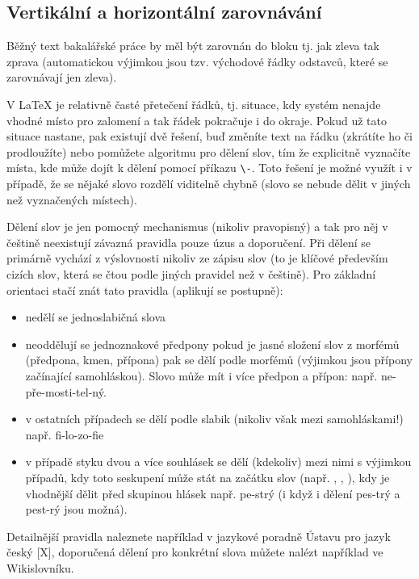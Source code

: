 \subsection{Vertikální a horizontální zarovnávání}

Běžný text bakalářské práce by měl být zarovnán do bloku tj. jak zleva tak zprava (automatickou výjimkou jsou tzv. východové řádky odstavců, které se zarovnávají jen zleva).

V \LaTeX{} je relativně časté přetečení řádků, tj. situace, kdy systém nenajde vhodné místo pro zalomení a tak řádek pokračuje i do okraje. Pokud už tato situace nastane, pak existují dvě řešení, buď změníte text na řádku (zkrátíte ho či prodloužíte) nebo pomůžete algoritmu pro dělení slov, tím že explicitně vyznačíte místa, kde může dojít k dělení pomocí příkazu \verb!\-!. Toto řešení je možné využít i v případě, že se nějaké slovo rozdělí viditelně chybně (slovo se nebude dělit v jiných než vyznačených místech).

Dělení slov je jen pomocný mechanismus (nikoliv pravopisný) a tak pro něj v češtině neexistují závazná pravidla pouze úzus a doporučení. Při dělení se primárně vychází z výslovnosti nikoliv ze zápisu slov (to je klíčové především cizích slov, která se čtou podle jiných pravidel než v češtině). Pro základní orientaci stačí znát tato pravidla (aplikují se postupně):

\begin{itemize}
\item nedělí se jednoslabičná slova
\item neoddělují se jednoznakové předpony
pokud je jasné složení slov z morfémů (předpona, kmen, přípona) pak se dělí podle morfémů (výjimkou jsou přípony začínající samohláskou). Slovo může mít i více předpon a přípon: např. ne-pře-mosti-tel-ný.
\item v ostatních případech se dělí podle slabik (nikoliv však mezi samohláskami!) např. fi-lo-zo-fie
\item v případě styku dvou a více souhlásek se dělí (kdekoliv) mezi nimi s výjimkou případů, kdy toto seskupení může stát na začátku slov (např. , , ), kdy je vhodnější dělit před skupinou hlásek např. pe-strý (i když i dělení pes-trý a pest-rý jsou možná).
\end{itemize}

Detailnější pravidla naleznete například v jazykové poradně Ústavu pro jazyk český [X], doporučená dělení pro konkrétní slova můžete nalézt například ve Wikislovníku.

